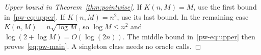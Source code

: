 \begin{proof}[Upper bound in Theorem~\ref{thm:pointwise}]
If $K(n,M)=M$, use the first bound in~\eqref{pw-eq:upper}. If $K(n,M)=n^2$, use its last bound. In the remaining case $K(n,M)=n\sqrt{\log M}$, so $\log M\le n^2$ and $\log(2+\log M)=O(\log(2n))$. The middle bound in~\eqref{pw-eq:upper} then proves~\eqref{eq:pw-main}. A singleton class needs no oracle calls.
\end{proof}


